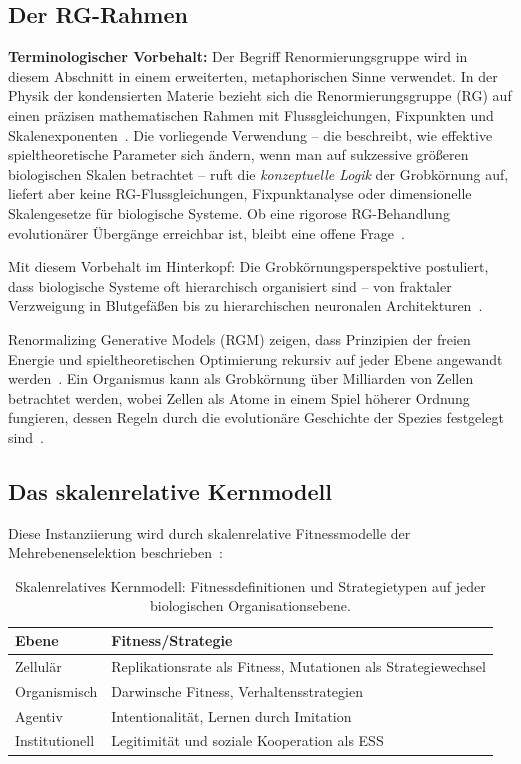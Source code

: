 \documentclass[12pt,a4paper]{article}
\theoremstyle{remark}
\begin{document}
\subsection{Der RG-Rahmen}

\textbf{Terminologischer Vorbehalt:} Der Begriff \glqq Renormierungsgruppe\grqq{} wird in diesem Abschnitt in einem erweiterten, metaphorischen Sinne verwendet. In der Physik der kondensierten Materie bezieht sich die Renormierungsgruppe (RG) auf einen präzisen mathematischen Rahmen mit Flussgleichungen, Fixpunkten und Skalenexponenten~\citep{ScaleRGResearch}. Die vorliegende Verwendung -- die beschreibt, wie effektive spieltheoretische Parameter sich ändern, wenn man auf sukzessive größeren biologischen Skalen betrachtet -- ruft die \emph{konzeptuelle Logik} der Grobkörnung auf, liefert aber keine RG-Flussgleichungen, Fixpunktanalyse oder dimensionelle Skalengesetze für biologische Systeme. Ob eine rigorose RG-Behandlung evolutionärer Übergänge erreichbar ist, bleibt eine offene Frage~\citep{ScaleRGFrontiers}.

Mit diesem Vorbehalt im Hinterkopf: Die Grobkörnungsperspektive postuliert, dass biologische Systeme oft hierarchisch organisiert sind -- von fraktaler Verzweigung in Blutgefäßen bis zu hierarchischen neuronalen Architekturen~\citep{SelfSimilarNetworks}.

Renormalizing Generative Models (RGM) zeigen, dass Prinzipien der freien Energie und spieltheoretischen Optimierung rekursiv auf jeder Ebene angewandt werden~\citep{ScaleRGFrontiers}. Ein Organismus kann als Grobkörnung über Milliarden von Zellen betrachtet werden, wobei Zellen als \glqq Atome\grqq{} in einem Spiel höherer Ordnung fungieren, dessen Regeln durch die evolutionäre Geschichte der Spezies festgelegt sind~\citep{ReplicatorOptimization}.

\subsection{Das skalenrelative Kernmodell}

Diese Instanziierung wird durch skalenrelative Fitnessmodelle der Mehrebenenselektion beschrieben~\citep{Okasha2006,Michod1999,ReplicatorOptimization}:

\begin{table}[htbp]
\centering
\caption{Skalenrelatives Kernmodell: Fitnessdefinitionen und Strategietypen auf jeder biologischen Organisationsebene.}
\label{tab:scale-kernel}
\begin{tabular}{ll}
\toprule
\textbf{Ebene} & \textbf{Fitness/Strategie} \\
\midrule
Zellulär & Replikationsrate als Fitness, Mutationen als Strategiewechsel \\
Organismisch & Darwinsche Fitness, Verhaltensstrategien \\
Agentiv & Intentionalität, Lernen durch Imitation \\
Institutionell & Legitimität und soziale Kooperation als ESS \\
\bottomrule
\end{tabular}
\end{table}
\end{document}
